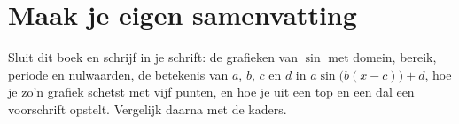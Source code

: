 \ifzelfstudie
\section*{Maak je eigen samenvatting}
Sluit dit boek en schrijf in je schrift: de grafieken van $\sin$ met domein, bereik, periode en nulwaarden, de betekenis van $a$, $b$, $c$ en $d$ in $a\sin\bigl(b(x - c)\bigr) + d$, hoe je zo'n grafiek schetst met vijf punten, en hoe je uit een top en een dal een voorschrift opstelt. Vergelijk daarna met de kaders.
\fi
